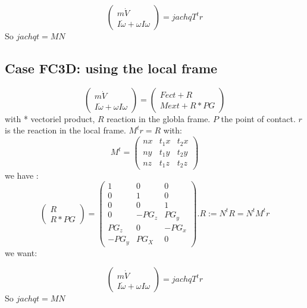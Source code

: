 \[\left(\begin{array}{c}m \dot V\\I \dot \omega + \omega I \omega \end{array}\right)=jachqT^t r\]
So $jachqt=MN$

\subsection{Case FC3D: using the local frame}

\[\left(\begin{array}{c}m \dot V\\I \dot \omega + \omega I \omega \end{array}\right)= \left(\begin{array}{c}Fect+R\\Mext + R*PG \end{array}\right)\]
  with * vectoriel product, $R$ reaction in the globla frame. $P$ the point of contact.
  $r$ is the reaction in the local frame.  $M^t r=R$ with:
  \[M^t=\left(\begin{array}{ccc} nx&t_1x&t_2x \\ny&t_1y&t_2y\\nz&t_1z&t_2z \end{array}\right)\]
  we have :
  \[\left(\begin{array}{c}R\\R*PG\end{array}\right)=\left(\begin{array}{ccc} 1&0&0\\0&1&0\\0&0&1\\
      0&-PG_z&PG_y\\PG_z&0&-PG_x\\-PG_y&PG_X&0\end{array}\right).R:=N^tR=N^tM^tr\]
      we want:
      
\[\left(\begin{array}{c}m \dot V\\I \dot \omega + \omega I \omega \end{array}\right)=jachqT^t r\]
So $jachqt=MN$
